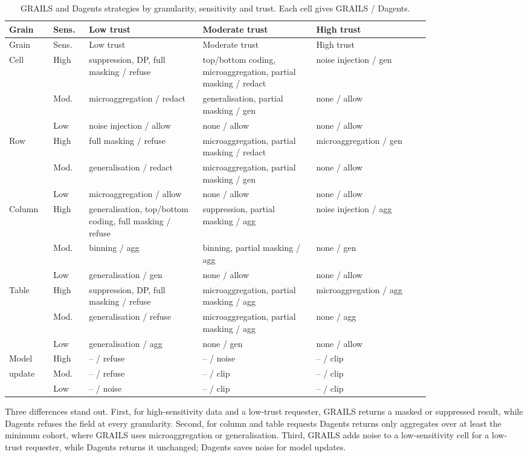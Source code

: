 {\footnotesize
\setlength{\tabcolsep}{3pt}
\begin{longtable}{@{}l l p{0.27\linewidth} p{0.27\linewidth} p{0.27\linewidth}@{}}
\caption{GRAILS and Dagents strategies by granularity, sensitivity and trust.
Each cell gives GRAILS / Dagents.}
\label{tab:rules}\\
\toprule
Grain & Sens. & Low trust & Moderate trust & High trust \\
\midrule
\endfirsthead
\toprule
Grain & Sens. & Low trust & Moderate trust & High trust \\
\midrule
\endhead
Cell & High & suppression, DP, full masking / refuse & top/bottom coding, microaggregation, partial masking / redact & noise injection / gen \\
 & Mod. & microaggregation / redact & generalisation, partial masking / gen & none / allow \\
 & Low & noise injection / allow & none / allow & none / allow \\
\midrule
Row & High & full masking / refuse & microaggregation, partial masking / redact & microaggregation / gen \\
 & Mod. & generalisation / redact & microaggregation, partial masking / gen & none / allow \\
 & Low & microaggregation / allow & none / allow & none / allow \\
\midrule
Column & High & generalisation, top/bottom coding, full masking / refuse & suppression, partial masking / agg & noise injection / agg \\
 & Mod. & binning / agg & binning, partial masking / agg & none / gen \\
 & Low & generalisation / gen & none / allow & none / allow \\
\midrule
Table & High & suppression, DP, full masking / refuse & microaggregation, partial masking / agg & microaggregation / agg \\
 & Mod. & generalisation / refuse & microaggregation, partial masking / agg & none / agg \\
 & Low & generalisation / agg & none / gen & none / allow \\
\midrule
Model & High & -- / refuse & -- / noise & -- / clip \\
update & Mod. & -- / refuse & -- / clip & -- / clip \\
 & Low & -- / noise & -- / clip & -- / clip \\
\bottomrule
\end{longtable}
}

Three differences stand out. First, for high-sensitivity data and a low-trust
requester, GRAILS returns a masked or suppressed result, while Dagents refuses
the field at every granularity. Second, for column and table requests Dagents
returns only aggregates over at least the minimum cohort, where GRAILS uses
microaggregation or generalisation. Third, GRAILS adds noise to a low-sensitivity
cell for a low-trust requester, while Dagents returns it unchanged; Dagents
saves noise for model updates.
